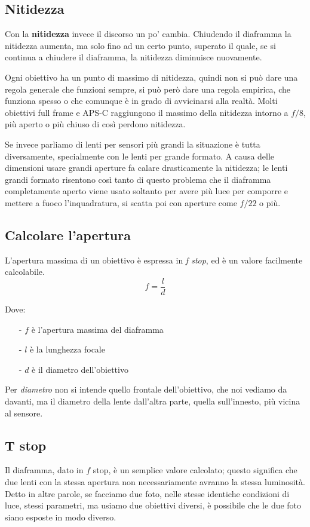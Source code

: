 \subsection{Nitidezza} \label{subsec:diaframmanitidezza}
Con la \textbf{nitidezza} invece il discorso un po' cambia. Chiudendo il diaframma la nitidezza aumenta, ma solo fino ad un certo punto, superato il quale, se si continua a chiudere il diaframma, la nitidezza diminuisce nuovamente.

Ogni obiettivo ha un punto di massimo di nitidezza, quindi non si può dare una regola generale che funzioni sempre, si può però dare una regola empirica, che funziona spesso o che comunque è in grado di avvicinarsi alla realtà.
Molti obiettivi full frame e APS-C raggiungono il massimo della nitidezza intorno a $f/8$, più aperto o più chiuso di così perdono nitidezza.

Se invece parliamo di lenti per sensori più grandi la situazione è tutta diversamente, specialmente con le lenti per grande formato. A causa delle dimensioni usare grandi aperture fa calare drasticamente la nitidezza; le lenti grandi formato risentono così tanto di questo problema che il diaframma completamente aperto viene usato soltanto per avere più luce per comporre e mettere a fuoco l'inquadratura, si scatta poi con aperture come $f/22$ o più.


\subsection{Calcolare l'apertura} \label{subsec:calcolareapertura}
L'apertura massima di un obiettivo è espressa in \textit{f stop}, ed è un valore facilmente calcolabile.
\[ f = \dfrac{l}{d} \]

Dove:
\begin{itemize}
    \item[-] $f$ è l'apertura massima del diaframma
    \item[-] $l$ è la lunghezza focale 
    \item[-] $d$ è il diametro dell'obiettivo 
\end{itemize}
Per \textit{diametro} non si intende quello frontale dell'obiettivo, che noi vediamo da davanti, ma il diametro della lente dall'altra parte, quella sull'innesto, più vicina al sensore.


\subsection{T stop} \label{subsec:tstop}
Il diaframma, dato in $f$ stop, è un semplice valore calcolato; questo significa che due lenti con la stessa apertura non necessariamente avranno la stessa luminosità.
Detto in altre parole, se facciamo due foto, nelle stesse identiche condizioni di luce, stessi parametri, ma usiamo due obiettivi diversi, è possibile che le due foto siano esposte in modo diverso.


